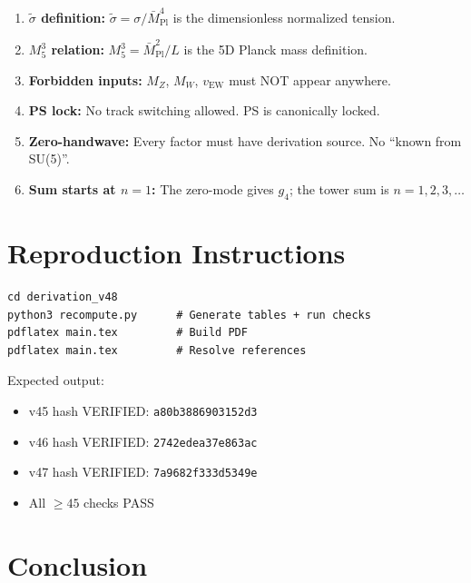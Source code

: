 \documentclass[11pt,a4paper]{article}
\begin{document}
\begin{enumerate}[label=\textbf{Trap \arabic*}:]
\item \textbf{$\tilde{\sigma}$ definition:}
$\tilde{\sigma} = \sigma/\bar{M}_{\text{Pl}}^4$ is the dimensionless normalized tension.

\item \textbf{$M_5^3$ relation:}
$M_5^3 = \bar{M}_{\text{Pl}}^2/L$ is the 5D Planck mass definition.

\item \textbf{Forbidden inputs:}
$M_Z$, $M_W$, $v_{\text{EW}}$ must NOT appear anywhere.

\item \textbf{PS lock:}
No track switching allowed. PS is canonically locked.

\item \textbf{Zero-handwave:}
Every factor must have derivation source. No ``known from SU(5)''.

\item \textbf{Sum starts at $n=1$:}
The zero-mode gives $g_4$; the tower sum is $n=1,2,3,\ldots$

\end{enumerate}

\section{Reproduction Instructions}
\label{sec:reproduction}

\begin{verbatim}
cd derivation_v48
python3 recompute.py      # Generate tables + run checks
pdflatex main.tex         # Build PDF
pdflatex main.tex         # Resolve references
\end{verbatim}

Expected output:
\begin{itemize}
\item v45 hash VERIFIED: \texttt{a80b3886903152d3}
\item v46 hash VERIFIED: \texttt{2742edea37e863ac}
\item v47 hash VERIFIED: \texttt{7a9682f333d5349e}
\item All $\geq 45$ checks PASS
\end{itemize}

\section{Conclusion}
\label{sec:conclusion}
\end{document}
